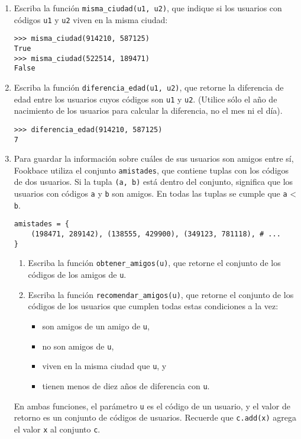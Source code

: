 \begin{enumerate}
\item
  Escriba la función \lstinline!misma_ciudad(u1, u2)!, que indique si
  los usuarios con códigos \lstinline!u1! y \lstinline!u2! viven en la
  misma ciudad:

\begin{lstlisting}
>>> misma_ciudad(914210, 587125)
True
>>> misma_ciudad(522514, 189471)
False
\end{lstlisting}
\item
  Escriba la función \lstinline!diferencia_edad(u1, u2)!, que retorne la
  diferencia de edad entre los usuarios cuyos códigos son \lstinline!u1!
  y \lstinline!u2!. (Utilice sólo el año de nacimiento de los usuarios
  para calcular la diferencia, no el mes ni el día).

\begin{lstlisting}
>>> diferencia_edad(914210, 587125)
7
\end{lstlisting}
\item
  Para guardar la información sobre cuáles de sus usuarios son amigos
  entre sí, Fookbace utiliza el conjunto \lstinline!amistades!, que
  contiene tuplas con los códigos de dos usuarios. Si la tupla
  \lstinline!(a, b)! está dentro del conjunto, significa que los
  usuarios con códigos \lstinline!a! y \lstinline!b! son amigos. En
  todas las tuplas se cumple que \lstinline!a! \textless{}
  \lstinline!b!.

\begin{lstlisting}
amistades = {
    (198471, 289142), (138555, 429900), (349123, 781118), # ...
}
\end{lstlisting}

  \begin{enumerate}
  \item
    Escriba la función \lstinline!obtener_amigos(u)!, que retorne el
    conjunto de los códigos de los amigos de \lstinline!u!.
  \item
    Escriba la función \lstinline!recomendar_amigos(u)!, que retorne el
    conjunto de los códigos de los usuarios que cumplen todas estas
    condiciones a la vez:

    \begin{itemize}
    \item
      son amigos de un amigo de \lstinline!u!,
    \item
      no son amigos de \lstinline!u!,
    \item
      viven en la misma ciudad que \lstinline!u!, y
    \item
      tienen menos de diez años de diferencia con \lstinline!u!.
    \end{itemize}
  \end{enumerate}

  En ambas funciones, el parámetro \lstinline!u! es el código de un
  usuario, y el valor de retorno es un conjunto de códigos de usuarios.
  Recuerde que \lstinline!c.add(x)! agrega el valor \lstinline!x! al
  conjunto \lstinline!c!.
\end{enumerate}

